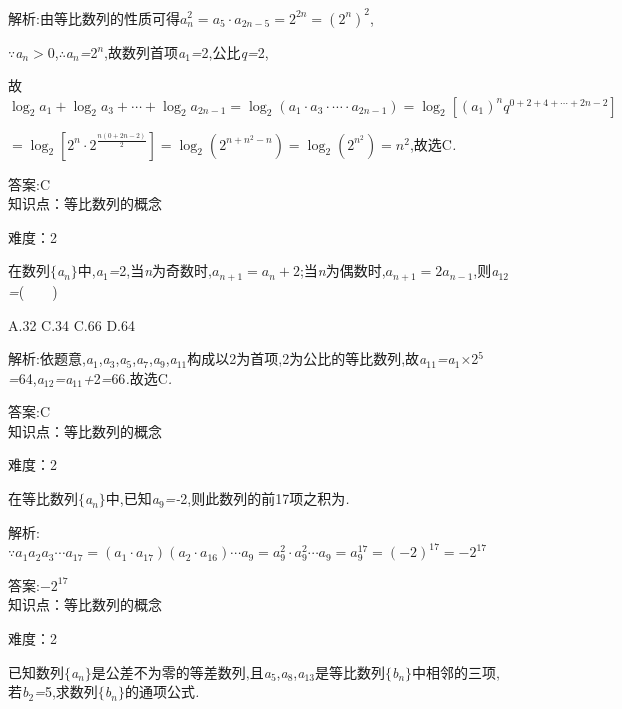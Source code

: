 \documentclass{article} %
\begin{document}
 解析:由等比数列的性质可得$a_n^2=a_5\cdot a_{2n-5}=2^{2n}=(2^n)^2$,

\textit{$\because$a${}_{n}$$>$}0,\textit{$\therefore$a${}_{n}$=}2\textit{${}^{n}$},故数列首项\textit{a}${}_{1}$\textit{=}2,公比\textit{q=}2,

故$\log_2 a_1+\log_2a_3+\cdots +\log_2a_{2n-1}=\log_2(a_1\cdot a_3\cdot \cdots 
\cdot a_{2n-1})=\log_2[(a_1)^nq^{0+2+4+\cdots+2n-2}]$

$=\log_2[2^n\cdot 2^{\frac{n(0+2n-2)}{2}}]=\log_2(2^{n+n^2-n})=\log_2(2^{n^2})=n^2$,故选C\textit{.}

 答案:C \\

知识点：等比数列的概念

难度：2

 在数列$\mathrm{\{}$\textit{a${}_{n}$}$\mathrm{\}}$中,\textit{a}${}_{1}$\textit{=}2,当\textit{n}为奇数时,$a_{n+1}=a_n+2$;当\textit{n}为偶数时,$a_{n+1}=2a_{n-1}$,则\textit{a}${}_{12}$\textit{=}(\textit{　　})

 A.32 C.34 C.66 D.64

 解析:依题意,\textit{a}${}_{1}$,\textit{a}${}_{3}$,\textit{a}${}_{5}$,\textit{a}${}_{7}$,\textit{a}${}_{9}$,\textit{a}${}_{11}$构成以2为首项,2为公比的等比数列,故\textit{a}${}_{11}$\textit{=a}${}_{1}$\textit{$\times$}2${}^{5}$\textit{=}64,\textit{a}${}_{12}$\textit{=a}${}_{11}$\textit{+}2\textit{=}66\textit{.}故选C\textit{.}

 答案:C \\

知识点：等比数列的概念

难度：2

 在等比数列$\mathrm{\{}$\textit{a${}_{n}$}$\mathrm{\}}$中,已知\textit{a}${}_{9}$\textit{=-}2,则此数列的前17项之积为\textit{\underbar{　　　　　}.~}

 解析:$\because a_1a_2a_3\cdots a_{17}=(a_1\cdot a_{17})(a_2\cdot a_{16})\cdots a_9=a_9^2\cdot a_9^2\cdots a_9=a_9^{17}=(-2)^{17}=-2^{17}$

 答案:$-2^{17}$ \\

知识点：等比数列的概念

难度：2

 已知数列$\mathrm{\{}$\textit{a${}_{n}$}$\mathrm{\}}$是公差不为零的等差数列,且\textit{a}${}_{5}$,\textit{a}${}_{8}$,\textit{a}${}_{13}$是等比数列$\mathrm{\{}$\textit{b${}_{n}$}$\mathrm{\}}$中相邻的三项,若\textit{b}${}_{2}$\textit{=}5,求数列$\mathrm{\{}$\textit{b${}_{n}$}$\mathrm{\}}$的通项公式\textit{.}
\end{document}
